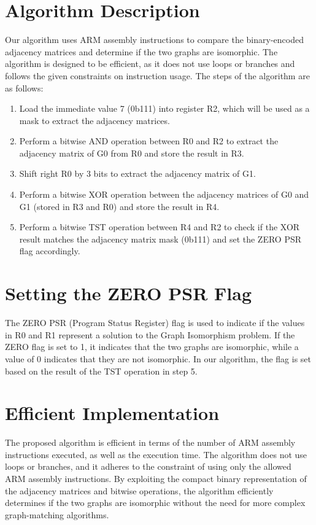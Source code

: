\section{Algorithm Description}
Our algorithm uses ARM assembly instructions to compare the binary-encoded adjacency matrices and determine if the two graphs are isomorphic. The algorithm is designed to be efficient, as it does not use loops or branches and follows the given constraints on instruction usage. The steps of the algorithm are as follows:

\begin{enumerate}
  \item Load the immediate value 7 (0b111) into register R2, which will be used as a mask to extract the adjacency matrices.
  \item Perform a bitwise AND operation between R0 and R2 to extract the adjacency matrix of G0 from R0 and store the result in R3.
  \item Shift right R0 by 3 bits to extract the adjacency matrix of G1.
  \item Perform a bitwise XOR operation between the adjacency matrices of G0 and G1 (stored in R3 and R0) and store the result in R4.
  \item Perform a bitwise TST operation between R4 and R2 to check if the XOR result matches the adjacency matrix mask (0b111) and set the ZERO PSR flag accordingly.
\end{enumerate}

\section{Setting the ZERO PSR Flag}
The ZERO PSR (Program Status Register) flag is used to indicate if the values in R0 and R1 represent a solution to the Graph Isomorphism problem. If the ZERO flag is set to 1, it indicates that the two graphs are isomorphic, while a value of 0 indicates that they are not isomorphic. In our algorithm, the flag is set based on the result of the TST operation in step 5.

\section{Efficient Implementation}
The proposed algorithm is efficient in terms of the number of ARM assembly instructions executed, as well as the execution time. The algorithm does not use loops or branches, and it adheres to the constraint of using only the allowed ARM assembly instructions. By exploiting the compact binary representation of the adjacency matrices and bitwise operations, the algorithm efficiently determines if the two graphs are isomorphic without the need for more complex graph-matching algorithms.

